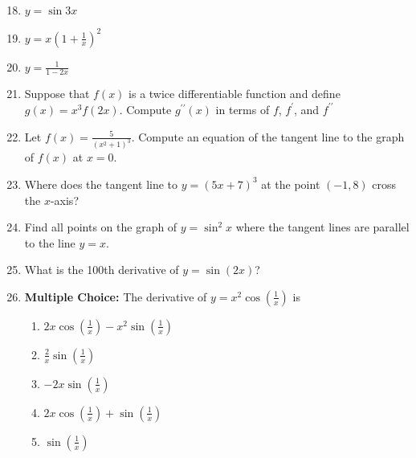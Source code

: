 \documentclass[12pt]{article}
\newif\ifans
\begin{document}

\begin{enumerate}
\setcounter{enumi}{17}

\item $y = \sin{3x}$ 

\ifans{\fbox{$-9\sin{3x}$}} \fi

\item $y = x\left(1+\frac{1}{x}\right)^2$ 

\ifans{\fbox{$2x^{-3}$}} \fi

\item $y = \frac{1}{1-2x}$ 

\ifans{\fbox{$\frac{8}{(1-2x)^3}$}} \fi

\item  Suppose that $f(x)$ is a twice differentiable function and define $g(x)=x^3f(2x)$.  Compute $g^{\prime \prime}(x)$ in terms of $f$, $f^{\prime}$, and $f^{\prime \prime}$

\ifans{\fbox{$g^{\prime \prime}(x)=4x^3f^{\prime \prime}(2x)+12x^2f^{\prime}(2x)+6xf(2x)$}} \fi

\item Let $f(x)=\frac{5}{(x^2+1)^3}$.  Compute an equation of the tangent line to the graph of $f(x)$ at $x=0$.

\ifans{\fbox{$y=5$}} \fi

\item Where does the tangent line to $y=(5x+7)^3$ at the point $(-1,8)$ cross the $x$-axis?

\ifans{\fbox{$x=-\frac{17}{15}$}} \fi

\item Find all points on the graph of $y=\sin^2{x}$ where the tangent lines are parallel to the line $y=x$.

\ifans{\fbox{$\frac{\pi}{4}+\pi k$ where $k$ is any integer}} \fi

\item What is the 100th derivative of $y=\sin{(2x)}$?

\ifans{\fbox{$2^{100}\sin{2x}$}} \fi

\item {\bf Multiple Choice:} The derivative of $y=x^2\cos{\left(\frac{1}{x}\right)}$ is

\begin{enumerate}

\item $2x\cos{\left(\frac{1}{x}\right)}-x^2\sin{\left(\frac{1}{x}\right)}$

\item $\frac{2}{x}\sin{\left(\frac{1}{x}\right)}$

\item $-2x\sin{\left(\frac{1}{x}\right)}$

\item $2x\cos{\left(\frac{1}{x}\right)}+\sin{\left(\frac{1}{x}\right)}$

\item $\sin{\left(\frac{1}{x}\right)}$

\end{enumerate}

\ifans{\fbox{D}} \fi

\end{enumerate}
\end{document}
